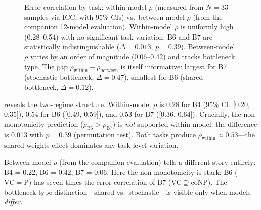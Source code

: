\documentclass{article}
\theoremstyle{definition}
\theoremstyle{remark}
\newcommand{\PTIME}{\mathrm{P}}
\newcommand{\coNP}{\mathrm{coNP}}
\newcommand{\VC}{\mathrm{VC}}           %
\begin{document}
\begin{figure}[t]
    \centering
    \caption{Error correlation by task: within-model $\rho$ (measured from $N = 33$ samples via ICC, with 95\% CIs) vs.\ between-model $\rho$ (from the companion 12-model evaluation). Within-model $\rho$ is uniformly high (0.28--0.54) with no significant task variation: B6 and B7 are statistically indistinguishable ($\Delta = 0.013$, $p = 0.39$). Between-model $\rho$ varies by an order of magnitude (0.06--0.42) and tracks bottleneck type. The gap $\rho_{\text{within}} - \rho_{\text{between}}$ is itself informative: largest for B7 (stochastic bottleneck, $\Delta = 0.47$), smallest for B6 (shared bottleneck, $\Delta = 0.12$).}
    \label{fig:correlation}
\end{figure}

 reveals the two-regime structure.
Within-model $\rho$ is 0.28 for B4 (95\% CI: [0.20, 0.35]), 0.54 for B6 ([0.49, 0.59]), and 0.53 for B7 ([0.36, 0.64]).
Crucially, the non-monotonicity prediction ($\rho_{\text{B6}} > \rho_{\text{B7}}$) is \emph{not} supported within-model: the difference is 0.013 with $p = 0.39$ (permutation test).
Both tasks produce $\rho_{\text{within}} \approx 0.53$---the shared-weights effect dominates any task-level variation.

Between-model $\rho$ (from the companion evaluation) tells a different story entirely: B4 = 0.22, B6 = 0.42, B7 = 0.06.
Here the non-monotonicity is stark: B6 ($\VC = \PTIME$) has seven times the error correlation of B7 ($\VC \supseteq \coNP$).
The bottleneck type distinction---shared vs.\ stochastic---is visible only when models \emph{differ}.
\end{document}
